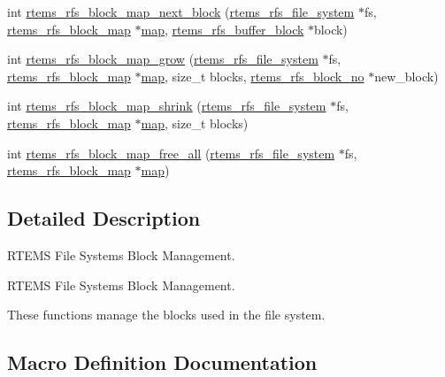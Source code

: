 \begin{DoxyCompactItemize}
\item 
int \mbox{\hyperlink{rtems-rfs-block_8h_a94ad6a90dc3f322eb58926d8d78af9c2}{rtems\+\_\+rfs\+\_\+block\+\_\+map\+\_\+next\+\_\+block}} (\mbox{\hyperlink{struct__rtems__rfs__file__system}{rtems\+\_\+rfs\+\_\+file\+\_\+system}} $\ast$fs, \mbox{\hyperlink{rtems-rfs-block_8h_af488270acef452a961e888bffdc3a7bf}{rtems\+\_\+rfs\+\_\+block\+\_\+map}} $\ast$\mbox{\hyperlink{struct__map}{map}}, \mbox{\hyperlink{rtems-rfs-buffer_8h_a5650d53328a5af0a78198fe780aec043}{rtems\+\_\+rfs\+\_\+buffer\+\_\+block}} $\ast$block)
\item 
int \mbox{\hyperlink{rtems-rfs-block_8h_aa0041e23dc7269c746a5d198fda8426d}{rtems\+\_\+rfs\+\_\+block\+\_\+map\+\_\+grow}} (\mbox{\hyperlink{struct__rtems__rfs__file__system}{rtems\+\_\+rfs\+\_\+file\+\_\+system}} $\ast$fs, \mbox{\hyperlink{rtems-rfs-block_8h_af488270acef452a961e888bffdc3a7bf}{rtems\+\_\+rfs\+\_\+block\+\_\+map}} $\ast$\mbox{\hyperlink{struct__map}{map}}, size\+\_\+t blocks, \mbox{\hyperlink{rtems-rfs-block-pos_8h_abbf8bb95acf9bd16ed3291f7da518e9a}{rtems\+\_\+rfs\+\_\+block\+\_\+no}} $\ast$new\+\_\+block)
\item 
int \mbox{\hyperlink{rtems-rfs-block_8h_a1609f6d6ac4378a5df7935a69bb2884d}{rtems\+\_\+rfs\+\_\+block\+\_\+map\+\_\+shrink}} (\mbox{\hyperlink{struct__rtems__rfs__file__system}{rtems\+\_\+rfs\+\_\+file\+\_\+system}} $\ast$fs, \mbox{\hyperlink{rtems-rfs-block_8h_af488270acef452a961e888bffdc3a7bf}{rtems\+\_\+rfs\+\_\+block\+\_\+map}} $\ast$\mbox{\hyperlink{struct__map}{map}}, size\+\_\+t blocks)
\item 
int \mbox{\hyperlink{rtems-rfs-block_8h_a1918b1aa888c6545497402764528ef99}{rtems\+\_\+rfs\+\_\+block\+\_\+map\+\_\+free\+\_\+all}} (\mbox{\hyperlink{struct__rtems__rfs__file__system}{rtems\+\_\+rfs\+\_\+file\+\_\+system}} $\ast$fs, \mbox{\hyperlink{rtems-rfs-block_8h_af488270acef452a961e888bffdc3a7bf}{rtems\+\_\+rfs\+\_\+block\+\_\+map}} $\ast$\mbox{\hyperlink{struct__map}{map}})
\end{DoxyCompactItemize}


\subsection{Detailed Description}
R\+T\+E\+MS File Systems Block Management. 

R\+T\+E\+MS File Systems Block Management.

These functions manage the blocks used in the file system. 

\subsection{Macro Definition Documentation}
\mbox{\label{rtems-rfs-block_8h_a1fae6583887a6e10a9fc10466aec4871}} 
